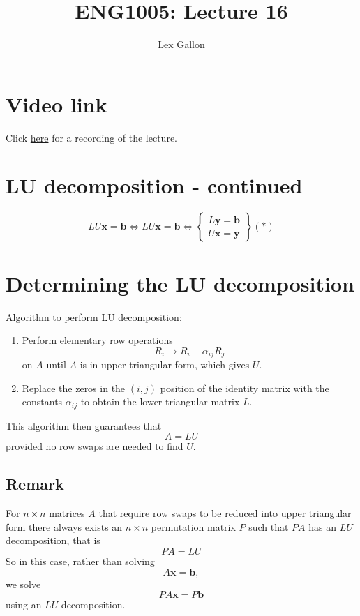\documentclass[11pt]{article}
\renewcommand{\vec}[1]{\mathbf{#1}}
\begin{document}
\title{ENG1005: Lecture 16}
\author{Lex Gallon}
\maketitle

\tableofcontents

\section*{Video link}
Click \href{https://echo360.org.au/lesson/G_8402119b-734b-4e1e-a3b4-7e907e86ddba_b944cecf-8ba5-40d3-a870-0243a0a9e78c_2020-04-28T15:58:00.000_2020-04-28T16:53:00.000/classroom#sortDirection=desc}{here} for a recording of the lecture.

\section{LU decomposition - continued}
\[ LU \vec{x} = \vec{b} \Leftrightarrow LU \vec{x} = \vec{b} 
\Leftrightarrow \left. \begin{cases} 
L \vec{y} = \vec{b} \\
U \vec{x} = \vec{y}
\end{cases} \right\}
(*)
\]

\section{Determining the LU decomposition}
Algorithm to perform LU decomposition:
\begin{enumerate}[ (i) ]
\item Perform elementary row operations 
\[ R_i \rightarrow R_i - \alpha_{ij} R_j \]
on $A$ until $A$ is in upper triangular form, which gives $U$.
\item Replace the zeros in the $(i, j)$ position of the identity matrix with the constants $\alpha_{ij}$ to obtain the lower triangular matrix $L$.
\end{enumerate}

This algorithm then guarantees that 
\[ A = LU \]
provided no row swaps are needed to find $U$.

\subsection{Remark}
For $n \times n$ matrices $A$ that require row swaps to be reduced into upper triangular form there always exists an $n \times n$ permutation matrix $P$ such that $PA$ has an $LU$ decomposition, that is
\[ PA = LU \]
So in this case, rather than solving
\[ A \vec{x} = \vec{b}, \]
we solve
\[ PA \vec{x} = P \vec{b} \]
using an $LU$ decomposition.
\end{document}

